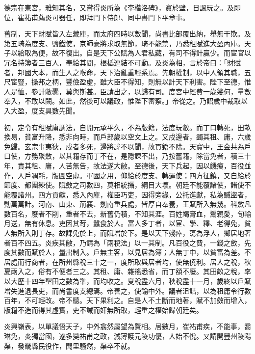 \begin{pinyinscope}
 德宗在東宮，雅知其名，又嘗得炎所為《李楷洛碑》，寘於壁，日諷玩之。及即位，崔祐甫薦炎可器任，即拜門下侍郎、同中書門下平章事。



 舊制，天下財賦皆入左藏庫，而太府四時以數聞，尚書比部覆出納，舉無干欺。及第五琦為度支、鹽鐵使，京師豪將求取無節，琦不能禁，乃悉租賦進大盈內庫。天子以給取為便，故不復出。自是天下公賦為人君私藏，有司不得計贏少。而宦官以冗名持簿者三百人，奉給其間，根柢連結不可動。及炎為相，言於帝曰：「財賦者，邦國大本，而生人之喉命，天下治亂重輕系焉。先朝權制，以中人領其職，五尺宦豎，操邦之柄，豐儉盈虛，雖大臣不得知，則無以計天下利害。陛下至德，惟人是恤，參計敝蠹，莫與斯甚。臣請出之，以歸有司。度宮中經費一歲幾何，量數奉入，不敢以闕。如此，然後可以議政，惟陛下審察。」帝從之。乃詔歲中裁取以入大盈，度支具數先聞。



 初，定令有租賦庸調法，自開元承平久，不為版籍，法度玩敝。而丁口轉死，田畝換易，貧富升降，悉非向時，而戶部歲以空文上之。又戍邊者，蠲其租、庸，六歲免歸。玄宗事夷狄，戍者多死，邊將諱不以聞，故貫籍不除。天寶中，王金共為戶口使，方務聚斂，以其籍存而丁不在，是隱課不出，乃按舊籍，除當免者，積三十年，責其租、庸，人苦無告，故法遂大敝。至德後，天下兵起，因以饑癘，百役並作，人戶凋耗，版圖空虛。軍國之用，仰給於度支、轉運使；四方征鎮，又自給於節度、都團練使。賦斂之司數四，莫相統攝，綱目大壞。朝廷不能覆諸使，諸使不能覆諸州。四方貢獻，悉入內庫，權臣巧吏，因得旁緣，公托進獻，私為贓盜者，動萬萬計。河南、山東、荊襄、劍南重兵處，皆厚自奉養，王賦所入無幾。科斂凡數百名，廢者不削，重者不去，新舊仍積，不知其涯。百姓竭膏血，鬻親愛，旬輸月送，無有休息。吏因其苛，蠶食於人。富人多丁者，以宦、學、釋、老得免，貧人無所入則丁存。故課免於上，而賦增於下。是以天下殘瘁，蕩為浮人，鄉居地著者百不四五。炎疾其敝，乃請為「兩稅法」以一其制。凡百役之費，一錢之斂，先度其數而賦於人，量出制入。戶無主客，以見居為簿；人無丁中，以貧富為差。不居處而行商者，在所州縣稅三十之一，度所取與居者均，使無僥利。居人之稅，秋夏兩入之，俗有不便者三之。其租、庸、雜徭悉省，而丁額不廢。其田畝之稅，率以大歷十四年墾田之數為準，而均收之。夏稅盡六月，秋稅盡十一月，歲終以戶賦增失進退長吏，而尚書度支總焉。帝善之，使諭中外。議者沮詰，以為租庸令行數百年，不可輕改。帝不聽。天下果利之。自是人不土斷而地著，賦不加斂而增入，版籍不造而得其虛實，吏不誡而奸無所取，輕重之權始歸朝廷矣。



 炎興嶺表，以單議悟天子，中外翕然屬望為賢相。居數月，崔祐甫疾，不能事，喬琳免，炎獨當國，遂多變祐甫之政，減薄護元陵功優，人始不悅。又請開豐州陵陽渠，發畿縣民役作，閭里騷然，渠卒不就。




\end{pinyinscope}
